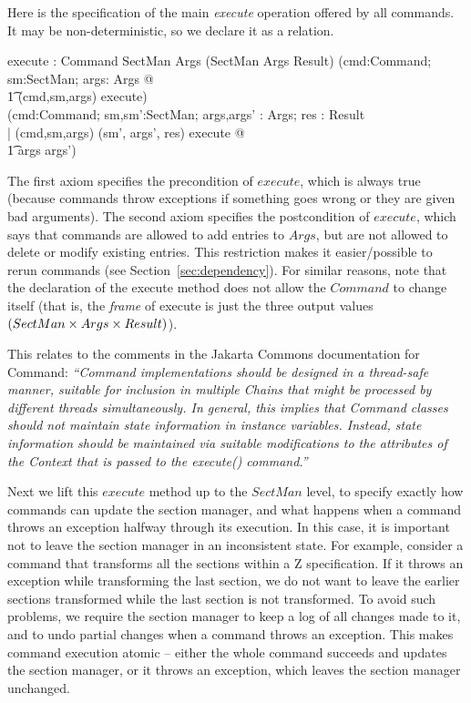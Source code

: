 \documentclass{llncs} %
\begin{document}
Here is the specification of the main \emph{execute} operation
offered by all commands.  It may be non-deterministic, so we declare
it as a relation. 

\begin{axdef}
  execute : Command \cross SectMan \cross Args 
       \rel (SectMan \cross Args \cross Result)
\where
  (\forall cmd:Command; sm:SectMan; args: Args @ \\
  \t1 (cmd,sm,args) \in \dom execute) \\
  (\forall cmd:Command; sm,sm':SectMan; args,args' : Args; res : Result\\
  | (cmd,sm,args) \mapsto (sm', args', res) \in execute @ \\
  \t1 args \subseteq args')
\end{axdef}

The first axiom specifies the precondition of $execute$, which is
always true (because commands throw exceptions if something goes wrong
or they are given bad arguments).  The second axiom specifies the
postcondition of $execute$, which says that commands are allowed to
add entries to $Args$, but are not allowed to delete or modify
existing entries.  This restriction makes it easier/possible to rerun
commands (see Section~\ref{sec:dependency}).  For similar reasons,
note that the declaration of the execute method does not allow the
$Command$ to change itself (that is, the \emph{frame} of execute is
just the three output values $(SectMan \cross Args \cross Result)$).

This relates to the comments in the Jakarta Commons documentation for
Command: \emph{``Command implementations should be designed in a
  thread-safe manner, suitable for inclusion in multiple Chains that might
  be processed by different threads simultaneously. In general, this
  implies that Command classes should not maintain state information in
  instance variables. Instead, state information should be maintained via
  suitable modifications to the attributes of the Context that is passed to
  the execute() command.''}


Next we lift this $execute$ method up to the $SectMan$ level,
to specify exactly how commands can update the section manager,
and what happens when a command throws an exception halfway
through its execution.  In this case, it is important not to
leave the section manager in an inconsistent state.  For example,
consider a command that transforms all the sections within a
Z specification.  If it throws an exception while transforming the
last section, we do not want to leave the earlier sections transformed
while the last section is not transformed.  To avoid such problems, we
require the section manager to keep a log of all changes made to it,
and to undo partial changes when a command throws an exception.
This makes command execution atomic -- either the whole command
succeeds and updates the section manager, or it throws an exception,
which leaves the section manager unchanged.
\end{document}
